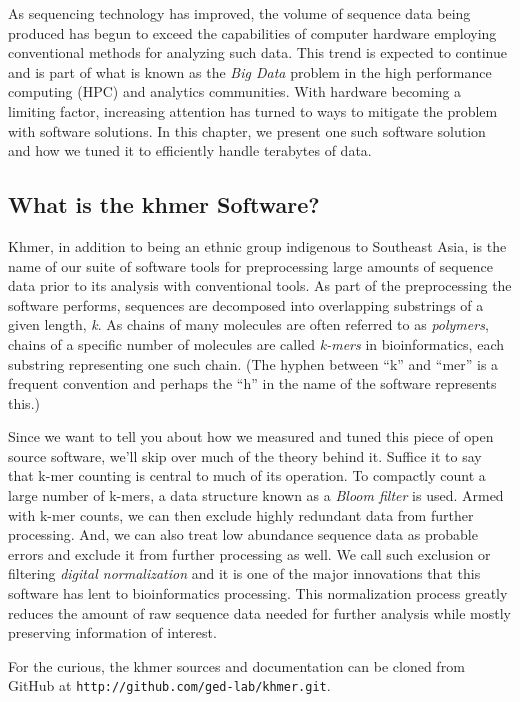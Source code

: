 \documentclass{article}
\begin{document}
As sequencing technology has improved, the volume of sequence data being produced has begun to exceed the capabilities of computer hardware employing conventional methods for analyzing such data. This trend is expected to continue and is part of what is known as the \textit{Big Data} problem in the high performance computing (HPC) and analytics communities. With hardware becoming a limiting factor, increasing attention has turned to ways to mitigate the problem with software solutions. In this chapter, we present one such software solution and how we tuned it to efficiently handle terabytes of data.

\subsection{What is the khmer Software?}

Khmer, in addition to being an ethnic group indigenous to Southeast Asia, is the name of our suite of software tools for preprocessing large amounts of sequence data prior to its analysis with conventional tools. As part of the preprocessing the software performs, sequences are decomposed into overlapping substrings of a given length, \textit{k}. As chains of many molecules are often referred to as \textit{polymers}, chains of a specific number of molecules are called \textit{k-mers} in bioinformatics, each substring representing one such chain. (The hyphen between ``k'' and ``mer'' is a frequent convention and perhaps the ``h'' in the name of the software represents this.)

Since we want to tell you about how we measured and tuned this piece of open source software, we'll skip over much of the theory behind it. Suffice it to say that k-mer counting is central to much of its operation. To compactly count a large number of k-mers, a data structure known as a \textit{Bloom filter} is used. Armed with k-mer counts, we can then exclude highly redundant data from further processing. And, we can also treat low abundance sequence data as probable errors and exclude it from further processing as well. We call such exclusion or filtering \textit{digital normalization} and it is one of the major innovations that this software has lent to bioinformatics processing. This normalization process greatly reduces the amount of raw sequence data needed for further analysis while mostly preserving information of interest.

For the curious, the khmer sources and documentation can be cloned from GitHub at \texttt{http://github.com/ged-lab/khmer.git}.
\end{document}
